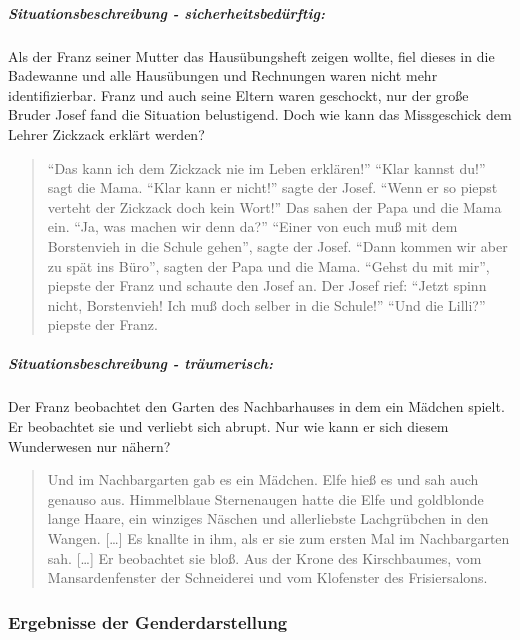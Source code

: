 \subparagraph{Situationsbeschreibung - sicherheitsbedürftig:}

Als der Franz seiner Mutter das Hausübungsheft zeigen wollte, fiel
dieses in die Badewanne und alle Hausübungen und Rechnungen waren nicht
mehr identifizierbar. Franz und auch seine Eltern waren geschockt, nur
der große Bruder Josef fand die Situation belustigend. Doch wie kann das
Missgeschick dem Lehrer Zickzack erklärt werden?

\begin{quote}
``Das kann ich dem Zickzack nie im Leben erklären!'' ``Klar kannst du!''
sagt die Mama. ``Klar kann er nicht!'' sagte der Josef. ``Wenn er so
piepst verteht der Zickzack doch kein Wort!'' Das sahen der Papa und die
Mama ein. ``Ja, was machen wir denn da?'' ``Einer von euch muß mit dem
Borstenvieh in die Schule gehen'', sagte der Josef. ``Dann kommen wir
aber zu spät ins Büro'', sagten der Papa und die Mama. ``Gehst du mit
mir'', piepste der Franz und schaute den Josef an. Der Josef rief:
``Jetzt spinn nicht, Borstenvieh! Ich muß doch selber in die Schule!''
``Und die Lilli?'' piepste der Franz. \parencite [25] {Noestlinger1996}
\end{quote}

\subparagraph{Situationsbeschreibung - träumerisch:}

Der Franz beobachtet den Garten des Nachbarhauses in dem ein Mädchen
spielt. Er beobachtet sie und verliebt sich abrupt. Nur wie kann er sich
diesem Wunderwesen nur nähern?

\begin{quote}
Und im Nachbargarten gab es ein Mädchen. Elfe hieß es und sah auch
genauso aus. Himmelblaue Sternenaugen hatte die Elfe und goldblonde
lange Haare, ein winziges Näschen und allerliebste Lachgrübchen in den
Wangen. {[}\ldots{}{]} Es knallte in ihm, als er sie zum ersten Mal im
Nachbargarten sah. {[}\ldots{}{]} Er beobachtet sie bloß. Aus der Krone
des Kirschbaumes, vom Mansardenfenster der Schneiderei und vom
Klofenster des Frisiersalons. \parencite[][46]{Noestlinger1991}
\end{quote}

\subsubsection{Ergebnisse der Genderdarstellung}

